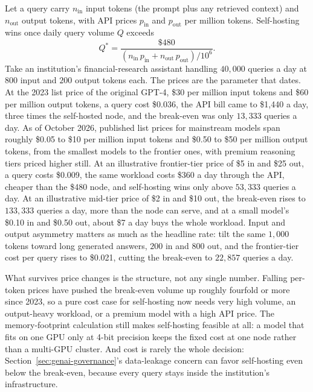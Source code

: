 \documentclass[../ai_in_finance]{subfiles}
\begin{document}
Let a query carry $n_{\text{in}}$ input tokens (the prompt plus any retrieved context) and $n_{\text{out}}$ output tokens, with API prices $p_{\text{in}}$ and $p_{\text{out}}$ per million tokens. Self-hosting wins once daily query volume $Q$ exceeds
\begin{equation*}
Q^{*} = \frac{\$480}{(n_{\text{in}}\,p_{\text{in}} + n_{\text{out}}\,p_{\text{out}})/10^{6}}.
\end{equation*}
Take an institution's financial-research assistant handling $40{,}000$ queries a day at $800$ input and $200$ output tokens each. The prices are the parameter that dates. At the 2023 list price of the original GPT-4, \$30 per million input tokens and \$60 per million output tokens, a query cost \$0.036, the API bill came to \$1,440 a day, three times the self-hosted node, and the break-even was only $13{,}333$ queries a day. As of October 2026, published list prices for mainstream models span roughly \$0.05 to \$10 per million input tokens and \$0.50 to \$50 per million output tokens, from the smallest models to the frontier ones, with premium reasoning tiers priced higher still. At an illustrative frontier-tier price of \$5 in and \$25 out, a query costs \$0.009, the same workload costs \$360 a day through the API, cheaper than the \$480 node, and self-hosting wins only above $53{,}333$ queries a day. At an illustrative mid-tier price of \$2 in and \$10 out, the break-even rises to $133{,}333$ queries a day, more than the node can serve, and at a small model's \$0.10 in and \$0.50 out, about \$7 a day buys the whole workload. Input and output asymmetry matters as much as the headline rate: tilt the same $1{,}000$ tokens toward long generated answers, $200$ in and $800$ out, and the frontier-tier cost per query rises to \$0.021, cutting the break-even to $22{,}857$ queries a day.

What survives price changes is the structure, not any single number. Falling per-token prices have pushed the break-even volume up roughly fourfold or more since 2023, so a pure cost case for self-hosting now needs very high volume, an output-heavy workload, or a premium model with a high API price. The memory-footprint calculation still makes self-hosting feasible at all: a model that fits on one GPU only at 4-bit precision keeps the fixed cost at one node rather than a multi-GPU cluster. And cost is rarely the whole decision: Section~\ref{sec:genai-governance}'s data-leakage concern can favor self-hosting even below the break-even, because every query stays inside the institution's infrastructure.
\end{document}
